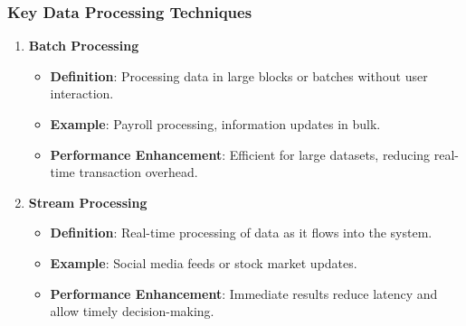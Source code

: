 \documentclass[aspectratio=169]{beamer}
\begin{document}
\begin{frame}[fragile]
    \frametitle{Key Data Processing Techniques}
    \begin{enumerate}
        \item \textbf{Batch Processing}
            \begin{itemize}
                \item \textbf{Definition}: Processing data in large blocks or batches without user interaction.
                \item \textbf{Example}: Payroll processing, information updates in bulk.
                \item \textbf{Performance Enhancement}: Efficient for large datasets, reducing real-time transaction overhead.
            \end{itemize}

        \item \textbf{Stream Processing}
            \begin{itemize}
                \item \textbf{Definition}: Real-time processing of data as it flows into the system.
                \item \textbf{Example}: Social media feeds or stock market updates.
                \item \textbf{Performance Enhancement}: Immediate results reduce latency and allow timely decision-making.
            \end{itemize}
    \end{enumerate}
\end{frame}
\end{document}
